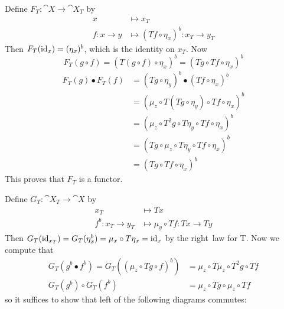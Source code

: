 \begin{beweis}
    \begin{itemize1}
    \item Define $F_T \colon \cat{X} \to \cat{X_T}$ by 
    \begin{align*}
        x &\mapsto x_T \\
        f \colon x \to y &\mapsto (Tf \circ \eta_x)^b \colon x_T \to y_T
    \end{align*}
    Then $F_T(\id_x) = (\eta_x)^b$, which is the identity on $x_T$. Now
    \[
        F_T(g \circ f) = (T(g \circ f) \circ \eta_x)^b = (Tg \circ Tf \circ \eta_x)^b
    \]
    \begin{align*}
        F_T(g) \bullet F_T(f) &= (Tg \circ \eta_y)^b \bullet (Tf \circ \eta_x)^b 
        \tag{Definition of $F^T$}\\
        &= (\mu_z \circ T(Tg \circ \eta_y) \circ Tf \circ \eta_x)^b 
        \tag{Definition of Kleisli composition}\\
        &= (\mu_z \circ T^2g \circ T\eta_y \circ Tf \circ \eta_x)^b 
        \tag{Functoriality of T}\\
        &= (Tg \circ \mu_z \circ T\eta_y \circ Tf \circ \eta_x)^b 
        \tag{Naturality of $\mu$}\\
        &= (Tg \circ Tf \circ \eta_x)^b \tag{right~\refunitality law for $T$}
    \end{align*}
    This proves that $F_T$ is a functor.
    \item Define $G_T \colon \cat{X_T} \to \cat{X}$ by
    \begin{align*}
        x_T &\mapsto Tx \\
        f^b \colon x_T \to y_T &\mapsto \mu_y \circ Tf \colon Tx \to Ty
    \end{align*}
    Then $G_T(\id_{x_T}) = G_T(\eta_x^b) = \mu_x \circ T\eta_x = \id_x$ by the right~ law for T.
    Now we compute that
    \begin{align*}
        G_T(g^b \bullet f^b) = G_T((\mu_z \circ Tg \circ f)^b) &=
        \mu_z \circ T \mu_z \circ T^2g \circ Tf \\
        G_T(g^b) \circ G_T(f^b) &= \mu_z \circ Tg \circ \mu_z \circ Tf 
    \end{align*}
    so it suffices to show that left of the following diagrams commutes:
    \begin{figure}[H]
    \centering
    \begin{subfigure}{0.45\textwidth}
    \centering
    \begin{tikzcd}

\end{tikzcd}
\end{subfigure}
\end{figure}
\end{itemize1}
\end{beweis}

